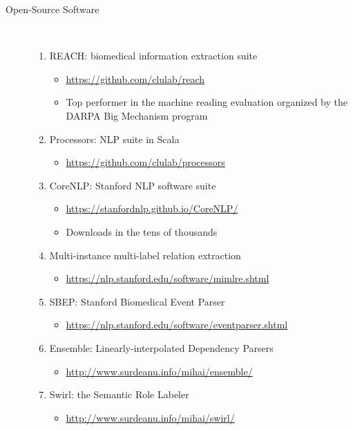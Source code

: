 \documentclass[10pt]{article}
\begin{document}
\begin{description}
\item [Open-Source Software]\

\begin{enumerate}

\item REACH: biomedical information extraction suite
\begin{itemize}
\item \url{https://github.com/clulab/reach}
\item Top performer in the machine reading evaluation organized by the DARPA Big Mechanism program
\end{itemize}

\item Processors: NLP suite in Scala
\begin{itemize}
\item \url{https://github.com/clulab/processors }
\end{itemize}

\item CoreNLP: Stanford NLP software suite
\begin{itemize}
\item \url{https://stanfordnlp.github.io/CoreNLP/}
\item Downloads in the tens of thousands
\end{itemize}

\item Multi-instance multi-label relation extraction
\begin{itemize}
\item \url{https://nlp.stanford.edu/software/mimlre.shtml}
\end{itemize}

\item SBEP: Stanford Biomedical Event Parser 
\begin{itemize}
\item \url{https://nlp.stanford.edu/software/eventparser.shtml}
\end{itemize}

\item Ensemble: Linearly-interpolated Dependency Parsers
\begin{itemize}
\item \url{http://www.surdeanu.info/mihai/ensemble/ }
\end{itemize}

\item Swirl: the Semantic Role Labeler
\begin{itemize}
\item \url{http://www.surdeanu.info/mihai/swirl/}
\end{itemize}


\end{enumerate}
\end{description}
\end{document}
